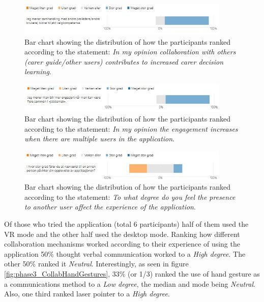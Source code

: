 \begin{figure}[H]
  \centering
   \captionsetup{width=.8\linewidth}
    \includegraphics[width=0.9\textwidth]{fig/phase_3/survey/ValgKompAppSamhandlingOkt.jpg}
 \caption{Bar chart showing the distribution of how the participants ranked according to the statement: \textit{In my opinion collaboration with others (carer guide/other users) contributes to increased carer decision learning}.}
\label{fig:phase3_SurveyCollaborationIncreased}
\end{figure}

\begin{figure}[H]
  \centering
   \captionsetup{width=.8\linewidth}
    \includegraphics[width=0.9\textwidth]{fig/phase_3/survey/ValgKompAppEngasjement.jpg}
 \caption{Bar chart showing the distribution of how the participants ranked according to the statement: \textit{In my opinion the engagement increases when there are multiple users in the application}.}
\label{fig:phase3_SurveyEngagementIncreased}
\end{figure}


\begin{figure}[H]
  \centering
   \captionsetup{width=.8\linewidth}
    \includegraphics[width=0.9\textwidth]{fig/phase_3/survey/ValgKompAppPrecence.jpg}
 \caption{Bar chart showing the distribution of how the participants ranked according to the statement: \textit{To what degree do you feel the presence to another user affect the experience of the application}.}
\label{fig:phase3_SurveyPrecenceIncrease}
\end{figure}




Of those who tried the application (total 6 participants) half of them used the VR mode and the other half used the desktop mode. Ranking how different collaboration mechanisms worked according to their experience of using the application 50\% thought verbal communication worked to a \textit{High degree}. The other 50\% ranked it \textit{Neutral}. Interestingly, as seen in figure \ref{fig:phase3_CollabHandGestures}, 33\% (or 1/3) ranked the use of hand gesture as a communications method to a \textit{Low degree}, the median and mode being \textit{Neutral}. Also, one third ranked laser pointer to a \textit{High degree}.

